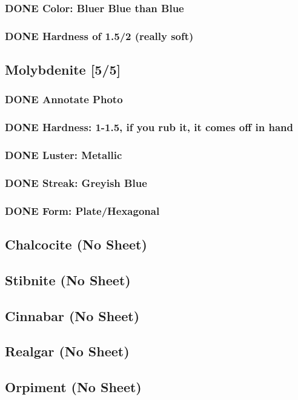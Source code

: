 \documentclass[11pt]{article}
\begin{document}
\subsubsection{{\bfseries\sffamily DONE} Color: Bluer Blue than Blue}
\label{sec-2-7-4}
\subsubsection{{\bfseries\sffamily DONE} Hardness of 1.5/2 (really soft)}
\label{sec-2-7-5}
\subsection{Molybdenite [5/5]}
\label{sec-2-8}
\subsubsection{{\bfseries\sffamily DONE} Annotate Photo}
\label{sec-2-8-1}
\subsubsection{{\bfseries\sffamily DONE} Hardness: 1-1.5, if you rub it, it comes off in hand}
\label{sec-2-8-2}
\subsubsection{{\bfseries\sffamily DONE} Luster: Metallic}
\label{sec-2-8-3}
\subsubsection{{\bfseries\sffamily DONE} Streak: Greyish Blue}
\label{sec-2-8-4}
\subsubsection{{\bfseries\sffamily DONE} Form: Plate/Hexagonal}
\label{sec-2-8-5}





\subsection{Chalcocite (No Sheet)}
\label{sec-2-9}
\subsection{Stibnite (No Sheet)}
\label{sec-2-10}
\subsection{Cinnabar (No Sheet)}
\label{sec-2-11}
\subsection{Realgar (No Sheet)}
\label{sec-2-12}
\subsection{Orpiment (No Sheet)}
\label{sec-2-13}
\end{document}
